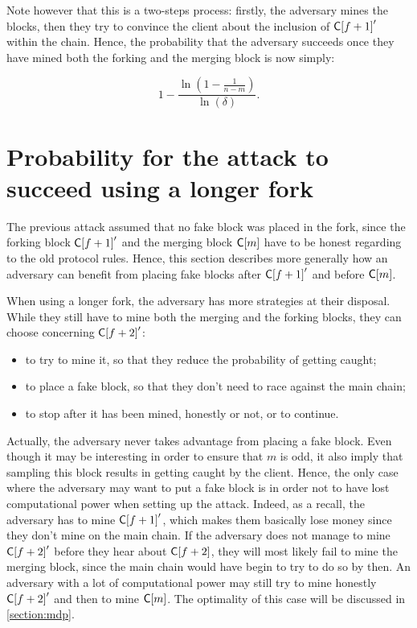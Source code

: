           Note however that this is a two-steps process: firstly, the adversary mines the blocks, then they try to convince the client about the inclusion of \(\mathsf{C[}f+1\mathsf{]}'\) within the chain. Hence, the probability that the adversary succeeds once they have mined both the forking and the merging block is now simply:

         \[        
                  1-\frac{\ln\left(1-\frac{1}{n-m}\right)}{\ln(\delta)}
         .\]

        \section{Probability for the attack to succeed using a longer fork}
        The previous attack assumed that no fake block was placed in the fork, since the forking block \(\mathsf{C[}f+1\mathsf{]}'\) and the merging block \(\mathsf{C[}m\mathsf{]}\) have to be honest regarding to the old protocol rules. Hence, this section describes more generally how an adversary can benefit from placing fake blocks after \(\mathsf{C[}f+1\mathsf{]}'\) and before \(\mathsf{C[}m\mathsf{]}\).

        When using a longer fork, the adversary has more strategies at their disposal. While they still have to mine both the merging and the forking blocks, they can choose concerning \(\mathsf{C[}f+2\mathsf{]}'\):

        \begin{itemize}
          \item to try to mine it, so that they reduce the probability of getting caught;
          \item to place a fake block, so that they don't need to race against the main chain;
          \item to stop after it has been mined, honestly or not, or to continue.
        \end{itemize}

        Actually, the adversary never takes advantage from placing a fake block. Even though it may be interesting in order to ensure that \(m\) is odd, it also imply that sampling this block results in getting caught by the client. Hence, the only case where the adversary may want to put a fake block is in order not to have lost computational power when setting up the attack. Indeed, as a recall, the adversary has to mine \(\mathsf{C[}f+1\mathsf{]}'\), which makes them basically lose money since they don't mine on the main chain. If the adversary does not manage to mine \(\mathsf{C[}f+2\mathsf{]}'\) before they hear about \(\mathsf{C[}f+2\mathsf{]}\), they will most likely fail to mine the merging block, since the main chain would have begin to try to do so by then. An adversary with a lot of computational power may still try to mine honestly \(\mathsf{C[}f+2\mathsf{]}'\) and then to mine \(\mathsf{C[}m\mathsf{]}\). The optimality of this case will be discussed in \autoref{section:mdp}.

